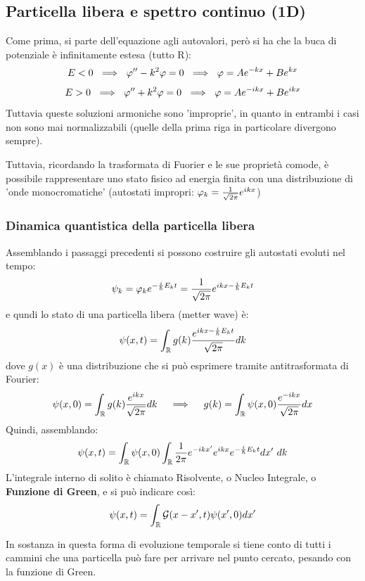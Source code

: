 \subsection{Particella libera e spettro continuo (1D)} 
Come prima, si parte dell'equazione agli autovalori, però si ha che la buca di potenziale è infinitamente estesa (tutto R):
\[
    E< 0\ \implies\ \vphi'' - k^2\vphi = 0\ \implies\ \vphi = Ae^{-kx}+Be^{kx}\]\[
    E> 0\ \implies\ \vphi'' + k^2\vphi = 0\ \implies\ \vphi = Ae^{-ikx}+Be^{ikx}
\]
Tuttavia queste soluzioni armoniche sono 'improprie', in quanto in entrambi i casi non sono mai normalizzabili (quelle della prima riga in particolare divergono sempre).

Tuttavia, ricordando la trasformata di Fuorier e le sue proprietà comode, è possibile rappresentare uno stato fisico ad energia finita con una distribuzione di 'onde monocromatiche' (autostati impropri: $\varphi_k = \frac{1}{\sqrt{2\pi}}e^{ikx}$)

\subsubsection*{Dinamica quantistica della particella libera}
Assemblando i passaggi precedenti si possono costruire gli autostati evoluti nel tempo:
\[
    \psi_k = \varphi_ke^{-\frac{i}{\hslash}E_kt} = \frac{1}{\sqrt{2\pi}} e^{ikx -\frac{i}{\hslash}E_kt}
\]
e qundi lo stato di una particella libera (metter wave) è:
\[
    \psi(x, t) = \int_{\mathbb{R}} g(k) \frac{e^{ikx -\frac{i}{\hslash}E_kt}}{\sqrt{2\pi}} dk
\]
dove $g(x)$ è una distribuzione che si può esprimere tramite antitrasformata di Fourier:
\[
    \psi(x, 0) = \int_{\mathbb{R}} g(k) \frac{e^{ikx}}{\sqrt{2\pi}} dk\ \ \ \implies \ \ \     g(k) = \int_{\mathbb{R}} \psi(x, 0) \frac{e^{-ikx}}{\sqrt{2\pi}} dx
\]
Quindi, assemblando:
\[
    \psi(x, t) = \rint \psi(x, 0) \rint \frac{1}{2\pi} e^{-ikx'} e^{ikx} e^{-\frac{i}{\hslash}E_kt} dx'\ dk
\]
L'integrale interno di solito è chiamato Risolvente, o Nucleo Integrale, o \textbf{Funzione di Green}, e si può indicare così:
\[
    \psi(x,t) = \int_{\mathbb{R}}\mathcal{G}(x-x',t)\psi(x',0)dx'
\]

In sostanza in questa forma di evoluzione temporale si tiene conto di tutti i cammini che una particella può fare per arrivare nel punto cercato, pesando con la funzione di Green.

